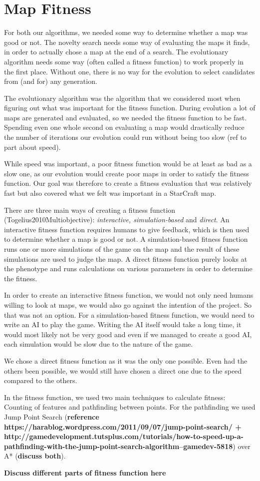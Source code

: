 \section{Map Fitness}
\label{MapFitness}

For both our algorithms, we needed some way to determine whether a map was good or not. The novelty search needs some way of evaluating the maps it finds, in order to actually chose a map at the end of a search. The evolutionary algorithm needs some way (often called a fitness function) to work properly in the first place. Without one, there is no way for the evolution to select candidates from (and for) any generation.

The evolutionary algorithm was the algorithm that we considered most when figuring out what was important for the fitness function. During evolution a lot of maps are generated and evaluated, so we needed the fitness function to be fast. Spending even one whole second on evaluating a map would drastically reduce the number of iterations our evolution could run without being too slow (ref to part about speed).

While speed was important, a poor fitness function would be at least as bad as a slow one, as our evolution would create poor maps in order to satisfy the fitness function. Our goal was therefore to create a fitness evaluation that was relatively fast but also covered what we felt was important in a StarCraft map.

There are three main ways of creating a fitness function (Togelius2010Multiobjective): \textit{interactive, simulation-based} and \textit{direct}. An interactive fitness function requires humans to give feedback, which is then used to determine whether a map is good or not. A simulation-based fitness function runs one or more simulations of the game on the map and the result of these simulations are used to judge the map. A direct fitness function purely looks at the phenotype and runs calculations on various parameters in order to determine the fitness.

In order to create an interactive fitness function, we would not only need humans willing to look at maps, we would also go against the intention of the project. So that was not an option. For a simulation-based fitness function, we would need to write an AI to play the game. Writing the AI itself would take a long time, it would most likely not be very good and even if we managed to create a good AI, each simulation would be slow due to the nature of the game.

We chose a direct fitness function as it was the only one possible. Even had the others been possible, we would still have chosen a direct one due to the speed compared to the others. 

In the fitness function, we used two main techniques to calculate fitness: Counting of features and pathfinding between points. For the pathfinding we used Jump Point Search (\textbf{reference https://harablog.wordpress.com/2011/09/07/jump-point-search/ + http://gamedevelopment.tutsplus.com/tutorials/how-to-speed-up-a-pathfinding-with-the-jump-point-search-algorithm--gamedev-5818}) over A* (\textbf{discuss both}).

\textbf{Discuss different parts of fitness function here}